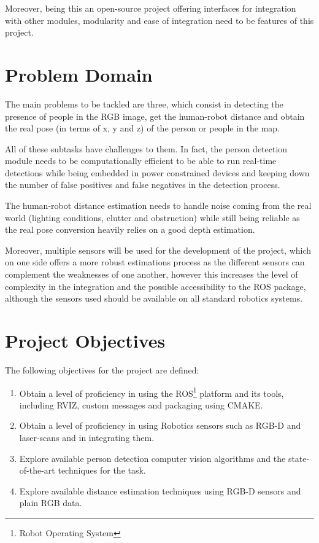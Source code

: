 Moreover, being this an open-source project offering interfaces for integration with other modules, modularity and ease of integration need to be features of this project.

\section{Problem Domain}

The main problems to be tackled are three, which consist in detecting the presence of people in the RGB image, get the human-robot distance and obtain the real pose (in terms of x, y and z) of the person or people in the map. 

All of these subtasks have challenges to them. In fact, the person detection module needs to be computationally efficient to be able to run real-time detections while being embedded in power constrained devices and keeping down the number of false positives and false negatives in the detection process.

The human-robot distance estimation needs to handle noise coming from the real world (lighting conditions, clutter and obstruction) while still being reliable as the real pose conversion heavily relies on a good depth estimation. 

Moreover, multiple sensors will be used for the development of the project, which on one side offers a more robust estimations process as the different sensors can complement the weaknesses of one another, however this increases the level of complexity in the integration and the possible accessibility to the ROS package, although the sensors used should be available on all standard robotics systems.

\section{Project Objectives}

The following objectives for the project are defined:

\begin{enumerate}
  \item Obtain a level of proficiency in using the ROS\footnote{Robot Operating
System} platform and its tools, including RVIZ, custom messages and packaging using CMAKE.
	\item Obtain a level of proficiency in using Robotics sensors such as RGB-D and laser-scans and in integrating them.
  \item Explore available person detection computer vision algorithms and the state-of-the-art techniques for the task.
  \item Explore available distance estimation techniques using RGB-D sensors and plain RGB data.
\end{enumerate}

